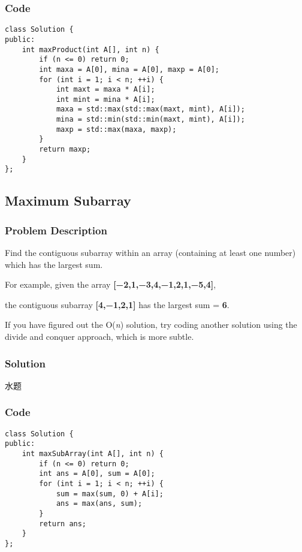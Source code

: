 \documentclass[courier]{article}
\begin{document}
\begin{CJK*}{UTF8}{gkai}
\subsubsection*{Code}
\begin{lstlisting}
class Solution {
public:
    int maxProduct(int A[], int n) {
        if (n <= 0) return 0;
        int maxa = A[0], mina = A[0], maxp = A[0];
        for (int i = 1; i < n; ++i) {
            int maxt = maxa * A[i];
            int mint = mina * A[i];
            maxa = std::max(std::max(maxt, mint), A[i]);
            mina = std::min(std::min(maxt, mint), A[i]);
            maxp = std::max(maxa, maxp);
        }
        return maxp;
    }
}; 
\end{lstlisting}


\subsection{ Maximum Subarray }

\subsubsection*{Problem Description}
Find the contiguous subarray within an array (containing at least one number) which has the largest sum.

For example, given the array \textbf{[−2,1,−3,4,−1,2,1,−5,4]},


the contiguous subarray \textbf{[4,−1,2,1]} has the largest sum = \textbf{6}.

If you have figured out the O(\emph{n}) solution, try coding another solution using the divide and conquer approach, which is more subtle.



\subsubsection*{Solution}
水题

\subsubsection*{Code}
\begin{lstlisting}
class Solution {
public:
    int maxSubArray(int A[], int n) {
        if (n <= 0) return 0;
        int ans = A[0], sum = A[0];
        for (int i = 1; i < n; ++i) {
            sum = max(sum, 0) + A[i];
            ans = max(ans, sum);
        }
        return ans;
    }
}; 
\end{lstlisting}



\end{CJK*}
\end{document}
